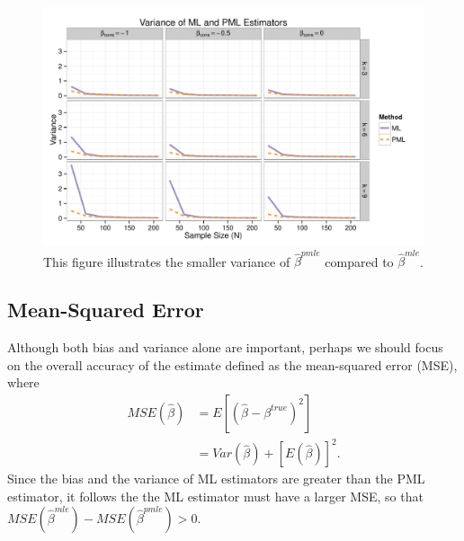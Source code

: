 \documentclass[12pt]{article}
\begin{document}
\begin{figure}[h]
\begin{center}
\includegraphics[width = \textwidth]{figs/sims-var.pdf}
\caption{This figure illustrates the smaller variance of $\hat{\beta}^{pmle}$ compared to $\hat{\beta}^{mle}$.}\label{fig:sims-var}
\end{center}
\end{figure}

\subsection*{Mean-Squared Error}

Although both bias and variance alone are important, perhaps we should focus on the overall accuracy of the estimate defined as the mean-squared error (MSE), where
\begin{align}\label{eqn:mse}
MSE(\hat{\beta}) &= E[(\hat{\beta} - \beta^{true})^2] \nonumber\\
                            &= Var(\hat{\beta}) + [E(\hat{\beta})]^2 \text{.}
\end{align}
Since the bias and the variance of ML estimators are greater than the PML estimator, it follows the the ML estimator must have a larger MSE, so that $MSE(\hat{\beta}^{mle}) - MSE(\hat{\beta}^{pmle}) > 0$. 
\end{document}

